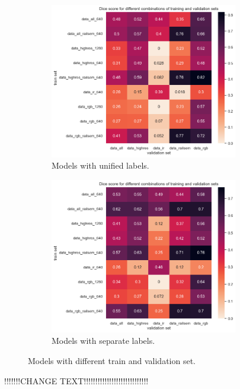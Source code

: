 \documentclass[Master,MDS,english]{BASE/twbook} %
\begin{document}
\begin{figure}
\centering
\begin{subfigure}[t]{.5\textwidth}
  \centering
  \includegraphics[width=0.9\textwidth]{images/yolo/models}
  \caption{Models with unified labels.}
\end{subfigure}%
\begin{subfigure}[t]{.5\textwidth}
  \centering
  \includegraphics[width=0.9\textwidth]{images/yolo/models_new_label}
  \caption{Models with separate labels. }
\end{subfigure}
\caption{Models with different train and validation set.}
\label{fig:yolo_models}
\end{figure}

 !!!!!!!CHANGE TEXT!!!!!!!!!!!!!!!!!!!!!!!!!!!!
\end{document}
